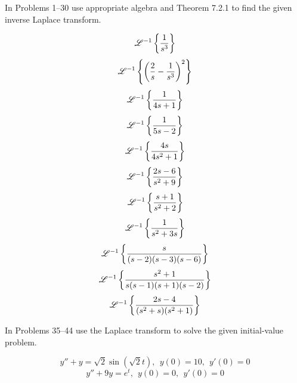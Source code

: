 \documentclass[chapter=7,section=2]{math252homework}
\begin{document}
\noindent In Problems 1--30 use appropriate algebra and Theorem 7.2.1 to find the given inverse Laplace transform.

\begin{problems}
	\problem \[ \mathscr{L}^{-1}\left\{ \frac{1}{s^{3}} \right\} \]										%
	\setcounter{problemsi}{3}
	\problem \[ \mathscr{L}^{-1} \left\{ \left( \frac{2}{s} - \frac{1}{s^{3}} \right)^{2} \right\} \]	%
	\setcounter{problemsi}{8}
	\problem \[ \mathscr{L}^{-1} \left\{ \frac{1}{4s+1} \right\} \]										%
	\problem \[ \mathscr{L}^{-1} \left\{ \frac{1}{5s-2} \right\} \]										%
	\setcounter{problemsi}{12}
	\problem \[ \mathscr{L}^{-1} \left\{ \frac{4s}{4s^{2} + 1} \right\} \]								%
	\setcounter{problemsi}{14}
	\problem \[ \mathscr{L}^{-1} \left\{ \frac{2s-6}{s^{2} + 9} \right\} \]								%
	\problem \[ \mathscr{L}^{-1} \left\{ \frac{s+1}{s^{2}+2} \right\} \]									%
	\problem \[ \mathscr{L}^{-1} \left\{ \frac{1}{s^{2} + 3s} \right\} \]								%
	\setcounter{problemsi}{22}
	\problem \[ \mathscr{L}^{-1} \left\{ \frac{s}{(s-2)(s-3)(s-6)} \right\} \]							%
	\problem \[ \mathscr{L}^{-1} \left\{ \frac{s^{2} + 1}{s(s-1)(s+1)(s-2)} \right\} \]					%
	\setcounter{problemsi}{26}
	\problem \[ \mathscr{L}^{-1} \left\{ \frac{2s-4}{(s^{2}+s)(s^{2}+1)} \right\} \]					%
\end{problems}

\noindent In Problems 35--44 use the Laplace transform to solve the given initial-value problem.
\begin{problems}[start=41]
	\problem \[ y'' + y = \sqrt{2}\sin\left(\sqrt{2}t\right),\ \ y(0)=10,\ \ y'(0)=0 \]					%
	\problem \[ y'' + 9y = e^{t},\ \ y(0)=0,\ \ y'(0)=0 \]												%
\end{problems}
\end{document}
